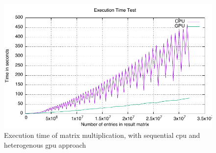 \begin{figure}[h!]
    \centering
    \includegraphics{figures/tests/graph.pdf}
    \caption{Execution time of matrix multiplication, with sequential \gls{cpu} and heterogenous \gls{gpu} approach}\label{fig:test_results}
\end{figure}

